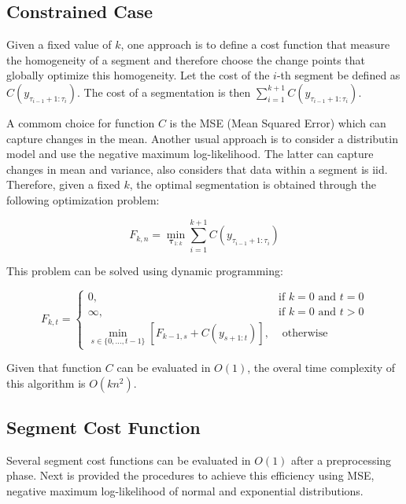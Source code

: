 \subsection{Constrained Case}

Given a fixed value of $k$, one approach is to define a cost function that measure the homogeneity of a segment and therefore choose the change points that globally optimize this homogeneity. Let the cost of the $i$-th segment be defined as $C(y_{\tau_{i - 1} + 1 : \tau_{i}})$. The cost of a segmentation is then $\sum \limits_{i = 1}^{k + 1} C(y_{\tau_{i - 1} + 1 : \tau_{i}})$.

A commom choice for function $C$ is the MSE (Mean Squared Error) which can capture changes in the mean. Another usual approach is to consider a distributin model and use the negative maximum log-likelihood. The latter can capture changes in mean and variance, also considers that data within a segment is iid. Therefore, given a fixed $k$, the optimal segmentation is obtained through the following optimization problem: 

\begin{equation}
    F_{k, n} = \min_{\boldsymbol \tau_{1 : k}} \sum \limits_{i = 1}^{k + 1} C(y_{\tau_{i - 1} + 1 : \tau_{i}})
\end{equation}

This problem can be solved using dynamic programming:

\begin{equation}
    F_{k, t} = 
    \begin{cases}
        0, & \text{if } k = 0 \text{ and } t = 0 \\
        \infty, & \text{if } k = 0 \text{ and } t > 0 \\
        \displaystyle \min_{s \in \{0, ..., t - 1\}} \left[ F_{k - 1, s} + C(y_{s + 1 : t}) \right], & \text{ otherwise}
    \end{cases}
\end{equation}

Given that function $C$ can be evaluated in $O(1)$, the overal time complexity of this algorithm is $O(k n^2)$.

\subsection{Segment Cost Function}

Several segment cost functions can be evaluated in $O(1)$ after a preprocessing phase. Next is provided the procedures to achieve this efficiency using MSE, negative maximum log-likelihood of normal and exponential distributions.


